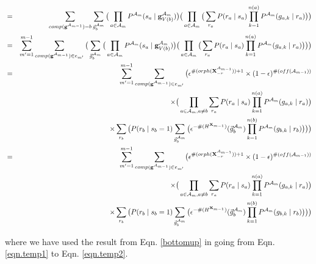 \documentclass[11pt]{article}
\newcommand{\A}{{\cal A}}
\newcommand{\X}{\mathbf{X}}
\newcommand{\XrmPrev}{\X^{\A_{m-1}}_{-r}}
\newcommand{\Am}{\A_{m}}
\newcommand{\gcompPrev}{comp(\mathbf{g}^{\A_{m-1}})}
\begin{document}
\begin{eqnarray}
&=&\sum_{\gcompPrev = b} \sum_{\vec{g}^{\Am}_{b}} \big( \prod_{a \in {\Am}} P^{\Am}(s_a \mid \mathbf{g}^{\Am}_{V({b})}) \big ) \big( \prod_{a \in {\A_{m}}} \big( \sum_{r_a} P(r_a \mid s_a) \prod_{k=1}^{n(a)} P^{\Am}(g_{a,k} \mid r_a) \big) \big) \\
%
&=& \sum_{m'=1}^{m-1} \sum_{\gcompPrev \in e_{m'}} \big(  \sum_{\vec{g}^{\Am}_{b}} \big( \prod_{a \in {\Am}} P^{\Am}(s_a \mid \mathbf{g}^{\Am}_{V({b})}) \big ) \big( \prod_{a \in {\A_{m}}} \big( \sum_{r_a} P(r_a \mid s_a) \prod_{k=1}^{n(a)} P^{\Am}(g_{a,k} \mid r_a) \big) \big) \big)  \label{eqn.temp1} \\
%
&=& \sum_{m'=1}^{m-1} \sum_{\gcompPrev \in e_{m'}}  \big(  \epsilon^{\#(orph(\XrmPrev)) + 1} \times (1-\epsilon)^{\#(off(\A_{m-1}))}  \label{eqn.temp2} \\ 
& & \times \big( \prod_{a \in {\A_{m}}, a \neq b} \sum_{r_a} P(r_a \mid s_a) \prod_{k=1}^{n(a)} P^{\Am}(g_{a,k} \mid r_a) \big)  \\
& & \times \sum_{r_b} \big(P(r_b \mid s_b = 1) \sum_{\vec{g}^{\Am}_{b}} \big( \epsilon^{-\#(H^{\X_{m-1}})}(\vec{g}^{\Am}_b) \prod_{k=1}^{n(b)} P^{\Am}(g_{b,k} \mid r_b) \big) \big) \big) \nonumber \\
%
&=& \sum_{m'=1}^{m-1} \sum_{\gcompPrev \in e_{m'}}  \big(  \epsilon^{\#(orph(\XrmPrev)) + 1} \times (1-\epsilon)^{\#(off(\A_{m-1}))}  \label{eqn.temp2} \\ 
& & \times \big( \prod_{a \in {\A_{m}}, a \neq b} \sum_{r_a} P(r_a \mid s_a) \prod_{k=1}^{n(a)} P^{\Am}(g_{a,k} \mid r_a) \big)  \\
& & \times \sum_{r_b} \big(P(r_b \mid s_b = 1) \sum_{\vec{g}^{\Am}_{b}} \big( \epsilon^{-\#(H^{\X_{m-1}})}(\vec{g}^{\Am}_b) \prod_{k=1}^{n(b)} P^{\Am}(g_{b,k} \mid r_b) \big) \big) \big) \nonumber \\
\end{eqnarray}

where we have used the result from Eqn. \ref{bottomup} in going from Eqn. \ref{eqn.temp1} to Eqn. \ref{eqn.temp2}.




\end{document}
